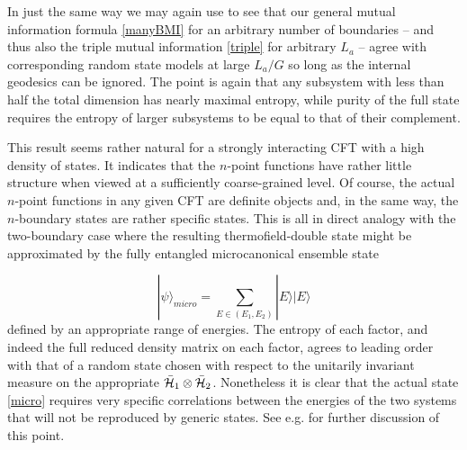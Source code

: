 \documentclass[12pt]{article}
\numberwithin{equation}{section}
\begin{document}
In just the same way we may again use \cite{Page:1993df} to see that our general mutual information formula \eqref{manyBMI} for an arbitrary number of boundaries -- and thus also the triple mutual information \eqref{triple} for arbitrary $L_a$ -- agree with corresponding random state models at large $L_a/G$ so long as the internal geodesics can be ignored.  The point is again that any subsystem with less than half the total dimension has nearly maximal entropy, while purity of the full state requires the entropy of larger subsystems to be equal to that of their complement.

This result seems rather natural for a strongly interacting CFT with a high density of states.  It indicates that the $n$-point functions have rather little structure when viewed at a sufficiently coarse-grained level.  Of course, the actual $n$-point functions in any given CFT are definite objects and, in the same way, the $n$-boundary states are rather specific states.  This is all in direct analogy with the two-boundary case where the resulting thermofield-double state might be approximated by the fully entangled microcanonical ensemble state

\begin{equation}
\label{micro}
|\psi \rangle_{micro} = \sum_{E \in (E_1, E_2)} |E\rangle |E\rangle
\end{equation}
defined by an appropriate range of energies.  The entropy of each factor, and indeed the full reduced density matrix on each factor, agrees to leading order with that of a random state chosen with respect to the unitarily invariant measure on the appropriate ${\cal \bar H}_1 \otimes {\cal\bar H}_2$.  Nonetheless it is clear that the actual state
\eqref{micro} requires very specific correlations between the energies of the two systems that will not be reproduced by generic states. See e.g. \cite{Marolf:2012xe,Marolf:2013dba,Balasubramanian:2014gla} for further discussion of this point.
\end{document}
